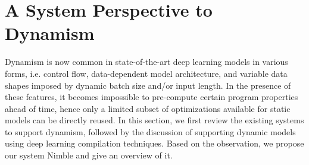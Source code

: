 



\section{A System Perspective to Dynamism}
\label{sec:nimble-background}


Dynamism is now common in state-of-the-art deep learning models in various forms, i.e. control flow, data-dependent model architecture, and variable data shapes imposed by dynamic batch size and/or input length.
In the presence of these features, it becomes impossible to pre-compute certain program properties ahead of time, hence only a limited subset of optimizations available for static models can be directly reused.
In this section, we first review the existing systems to support dynamism, followed by the discussion of supporting dynamic models using deep learning compilation techniques. Based on the observation, we propose our system Nimble and give an overview of it.

